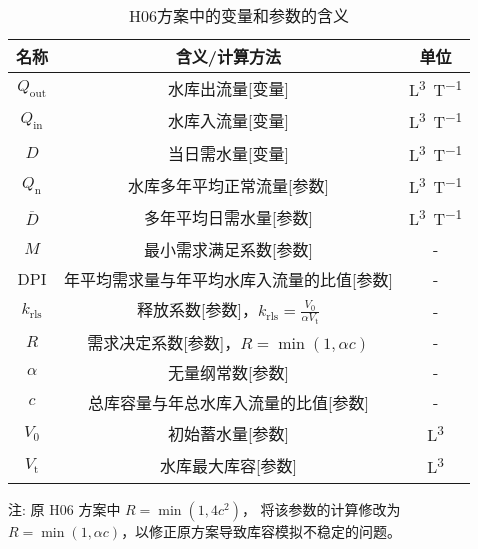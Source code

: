 \begin{table}[htbp]
  \centering
  \caption{H06方案中的变量和参数的含义}
  \label{tab:H06方案变量参数表}
  \begin{threeparttable}
    \begin{tabular}{ccc}
      \toprule
      名称               & 含义/计算方法                                                            & 单位              \\ \midrule
      $Q_{\mathrm{out}}$ & 水库出流量[变量]                                                         & \unit{L^3.T^{-1}} \\
      $Q_{\mathrm{in}}$  & 水库入流量[变量]                                                         & \unit{L^3.T^{-1}} \\
      $D$                & 当日需水量[变量]                                                         & \unit{L^3.T^{-1}} \\
      $Q_{\mathrm {n}} $ & 水库多年平均正常流量[参数]                                               & \unit{L^3.T^{-1}} \\
      $\overline{D}$     & 多年平均日需水量[参数]                                                   & \unit{L^3.T^{-1}} \\
      $M$                & 最小需求满足系数[参数]                                                   & -                 \\
      DPI                & 年平均需求量与年平均水库入流量的比值[参数]                               & -                 \\
      $k_{\mathrm{rls}}$ & 释放系数[参数]，$k_{\mathrm{rls}} = \frac{V_0}{\alpha V_{\mathrm {t}} }$ & -                 \\
      $R$                & 需求决定系数[参数]，$R=\min(1, \alpha c)$                                & -                 \\
      $\alpha$           & 无量纲常数[参数]                                                         & -                 \\
      $c$                & 总库容量与年总水库入流量的比值[参数]                                     & -                 \\
      $V_0$              & 初始蓄水量[参数]                                                         & \unit{L^3}        \\
      $V_{\mathrm {t}} $ & 水库最大库容[参数]                                                       & \unit{L^3}        \\
      \bottomrule
    \end{tabular}
    \begin{tablenotes}
      \footnotesize
    \item[注:] 原 H06 方案中 $R=\min(1,4 c^2)$，\citet{Shin-etal_19} 将该参数的计算修改为 $R=\min(1,\alpha c)$，以修正原方案导致库容模拟不稳定的问题。
    \end{tablenotes}
  \end{threeparttable}
\end{table}

